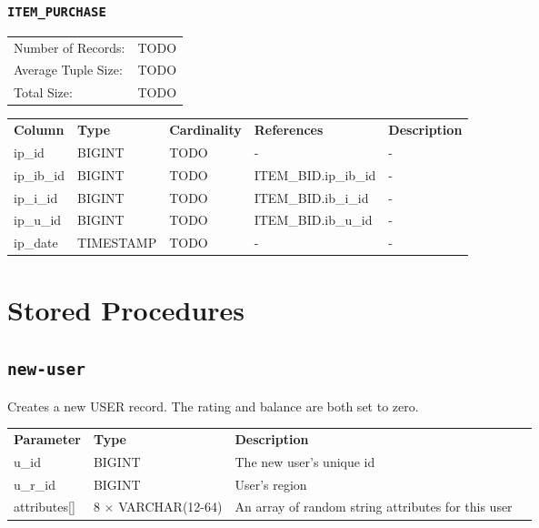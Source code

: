 \documentclass[a4paper,10pt]{article}
\begin{document}
\subsubsection{\texttt{ITEM\_PURCHASE}}

\begin{tabular}{ll}
Number of Records:      & TODO \\
Average Tuple Size:     & TODO \\
Total Size:             & TODO \\
\end{tabular}

\vspace*{0.1in}

\noindent \begin{tabular*}{\textwidth}{@{\extracolsep{\fill}} lllll}
\textbf{Column} & \textbf{Type} & \textbf{Cardinality} & \textbf{References} & \textbf{Description} \\
ip\_id             & BIGINT     & TODO & -               & - \\
ip\_ib\_id         & BIGINT     & TODO & ITEM\_BID.ip\_ib\_id & - \\
ip\_i\_id          & BIGINT     & TODO & ITEM\_BID.ib\_i\_id & - \\
ip\_u\_id          & BIGINT     & TODO & ITEM\_BID.ib\_u\_id & - \\
ip\_date           & TIMESTAMP  & TODO & -               & - \\
\end{tabular*}

\section{Stored Procedures}

\subsection{\texttt{new-user}}
Creates a new USER record. The rating and balance are both set to zero. \\

\noindent \begin{tabular*}{\textwidth}{@{\extracolsep{\fill}} llll}
\textbf{Parameter} & \textbf{Type} & \textbf{Description} \\
u\_id           & BIGINT                & The new user's unique id \\
u\_r\_id        & BIGINT                & User's region \\
attributes[]    & 8 $\times$ VARCHAR(12-64)        & An array of random string attributes for this user \\
\end{tabular*}
\end{document}
